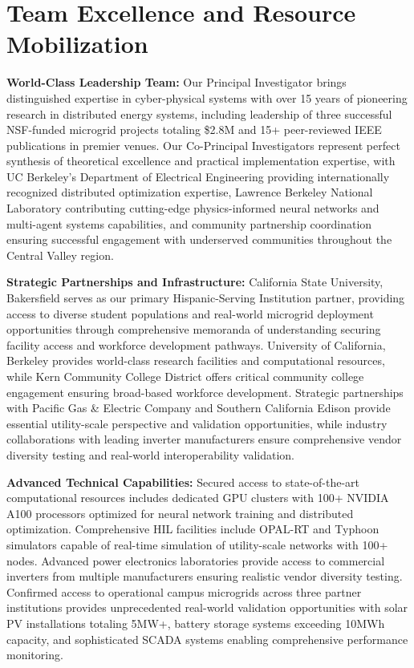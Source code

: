 \documentclass[12pt]{article}
\begin{document}
\section{Team Excellence and Resource Mobilization}

\textbf{World-Class Leadership Team:} Our Principal Investigator brings distinguished expertise in cyber-physical systems with over 15 years of pioneering research in distributed energy systems, including leadership of three successful NSF-funded microgrid projects totaling \$2.8M and 15+ peer-reviewed IEEE publications in premier venues. Our Co-Principal Investigators represent perfect synthesis of theoretical excellence and practical implementation expertise, with UC Berkeley's Department of Electrical Engineering providing internationally recognized distributed optimization expertise, Lawrence Berkeley National Laboratory contributing cutting-edge physics-informed neural networks and multi-agent systems capabilities, and community partnership coordination ensuring successful engagement with underserved communities throughout the Central Valley region.

\textbf{Strategic Partnerships and Infrastructure:} California State University, Bakersfield serves as our primary Hispanic-Serving Institution partner, providing access to diverse student populations and real-world microgrid deployment opportunities through comprehensive memoranda of understanding securing facility access and workforce development pathways. University of California, Berkeley provides world-class research facilities and computational resources, while Kern Community College District offers critical community college engagement ensuring broad-based workforce development. Strategic partnerships with Pacific Gas \& Electric Company and Southern California Edison provide essential utility-scale perspective and validation opportunities, while industry collaborations with leading inverter manufacturers ensure comprehensive vendor diversity testing and real-world interoperability validation.

\textbf{Advanced Technical Capabilities:} Secured access to state-of-the-art computational resources includes dedicated GPU clusters with 100+ NVIDIA A100 processors optimized for neural network training and distributed optimization. Comprehensive HIL facilities include OPAL-RT and Typhoon simulators capable of real-time simulation of utility-scale networks with 100+ nodes. Advanced power electronics laboratories provide access to commercial inverters from multiple manufacturers ensuring realistic vendor diversity testing. Confirmed access to operational campus microgrids across three partner institutions provides unprecedented real-world validation opportunities with solar PV installations totaling 5MW+, battery storage systems exceeding 10MWh capacity, and sophisticated SCADA systems enabling comprehensive performance monitoring.
\end{document}
